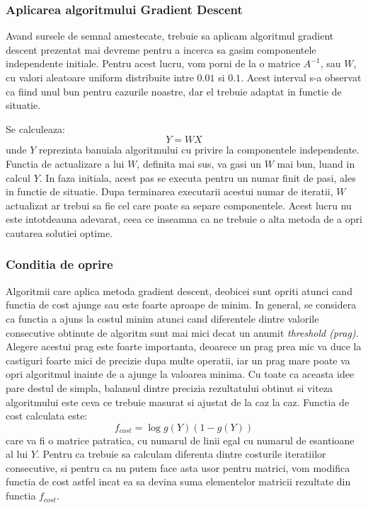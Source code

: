 \documentclass[12pt]{article}
\begin{document}
\subsubsection{Aplicarea algoritmului Gradient Descent}
Avand sursele de semnal amestecate, trebuie sa aplicam algoritmul gradient descent prezentat mai devreme pentru a incerca sa gasim componentele independente initiale. Pentru acest lucru, vom porni de la o matrice $A^{-1}$, sau $W$, cu valori aleatoare uniform distribuite intre $0.01$ si $0.1$. Acest interval s-a observat ca fiind unul bun pentru cazurile noastre, dar el trebuie adaptat in functie de situatie. 

Se calculeaza:
\begin{equation}
	Y=WX
\end{equation} 
unde $Y$ reprezinta banuiala algoritmului cu privire la componentele independente. Functia de actualizare a lui $W$, definita mai sus, va gasi un $W$ mai bun, luand in calcul $Y$. In faza initiala, acest pas se executa pentru un numar finit de pasi, ales in functie de situatie. Dupa terminarea executarii acestui numar de iteratii, $W$ actualizat ar trebui sa fie cel care poate sa separe componentele. Acest lucru nu este intotdeauna adevarat, ceea ce inseamna ca ne trebuie o alta metoda de a opri cautarea solutiei optime.

\subsubsection{Conditia de oprire}
Algoritmii care aplica metoda gradient descent, deobicei sunt opriti atunci cand functia de cost ajunge sau este foarte aproape de minim. In general, se considera ca functia a ajuns la costul minim atunci cand diferentele dintre valorile consecutive obtinute de algoritm sunt mai mici decat un anumit \textit{threshold (prag)}. Alegere acestui prag este foarte importanta, deoarece un prag prea mic va duce la castiguri foarte mici de precizie dupa multe operatii, iar un prag mare poate va opri algoritmul inainte de a ajunge la valoarea minima. Cu toate ca aceasta idee pare destul de simpla, balansul dintre precizia rezultatului obtinut si viteza algoritmului este ceva ce trebuie masurat si ajustat de la caz la caz. Functia de cost calculata este:
\begin{equation}
	f_{cost}=\log g(Y)(1-g(Y))
\end{equation}
care va fi o matrice patratica, cu numarul de linii egal cu numarul de esantioane al lui $Y$. Pentru ca trebuie sa calculam diferenta dintre costurile iteratiilor consecutive, si pentru ca nu putem face asta usor pentru matrici, vom modifica functia de cost astfel incat ea sa devina suma elementelor matricii rezultate din functia $f_{cost}$.
\end{document}
